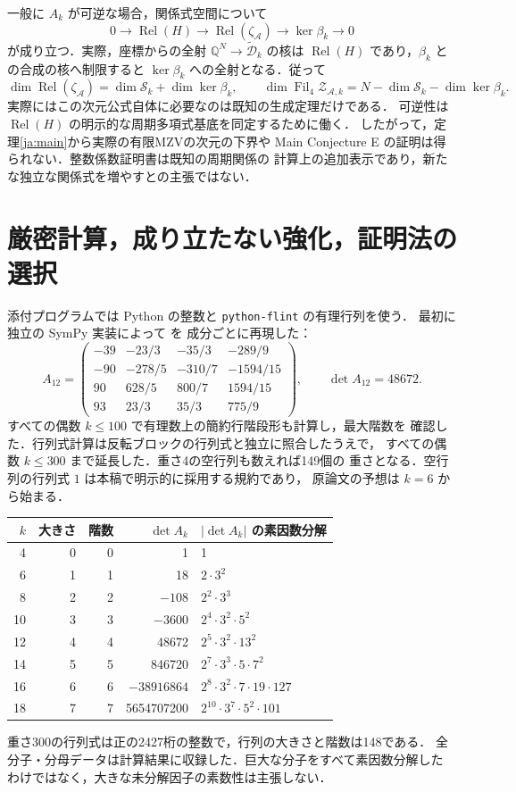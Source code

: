 \documentclass[12pt]{amsart}
\theoremstyle{definition}
\theoremstyle{remark}
\numberwithin{equation}{section}
\newcommand{\Q}{\mathbb{Q}}
\newcommand{\Fil}{\operatorname{Fil}}
\newcommand{\za}{\zeta_{\mathcal A}}
\newcommand{\Dtilde}{\widetilde{\mathcal D}_k}
\newcommand{\Relf}{\operatorname{Rel}}
\theoremstyle{definition}
\theoremstyle{remark}
\begin{document}
一般に $A_k$ が可逆な場合，関係式空間について
\begin{equation}\label{ja:exactseq}
 0\longrightarrow\Relf(H)\longrightarrow\Relf(\za)
 \longrightarrow\ker\beta_k\longrightarrow0
\end{equation}
が成り立つ．実際，座標からの全射 $\Q^N\to\Dtilde$ の核は
$\Relf(H)$ であり，$\beta_k$ との合成の核へ制限すると
$\ker\beta_k$ への全射となる．従って
\[
 \dim\Relf(\za)=\dim\mathcal S_k+\dim\ker\beta_k,
 \qquad \dim\Fil_4\mathcal Z_{\mathcal A,k}
 =N-\dim\mathcal S_k-\dim\ker\beta_k.
\]
実際にはこの次元公式自体に必要なのは既知の生成定理だけである．
可逆性は $\Relf(H)$ の明示的な周期多項式基底を同定するために働く．
したがって，定理\ref{ja:main}から実際の有限MZVの次元の下界や
Main Conjecture E の証明は得られない．整数係数証明書は既知の周期関係の
計算上の追加表示であり，新たな独立な関係式を増やすとの主張ではない．

\section{厳密計算，成り立たない強化，証明法の選択}
添付プログラムでは Python の整数と \texttt{python-flint} の有理行列を使う．
最初に独立の SymPy 実装によって \cite[Example 5.18]{jBR} を
成分ごとに再現した：
\[
 A_{12}=\begin{pmatrix}
 -39&-23/3&-35/3&-289/9\\
 -90&-278/5&-310/7&-1594/15\\
 90&628/5&800/7&1594/15\\
 93&23/3&35/3&775/9
 \end{pmatrix},\qquad\det A_{12}=48672.
\]
すべての偶数 $k\leq100$ で有理数上の簡約行階段形も計算し，最大階数を
確認した．行列式計算は反転ブロックの行列式と独立に照合したうえで，
すべての偶数 $k\leq300$ まで延長した．重さ4の空行列も数えれば149個の
重さとなる．空行列の行列式 $1$ は本稿で明示的に採用する規約であり，
原論文の予想は $k=6$ から始まる．

\begin{center}
\begin{tabular}{rrrrl}
\toprule
$k$&大きさ&階数&$\det A_k$&$|\det A_k|$ の素因数分解\\
\midrule
4&0&0&1&1\\
6&1&1&18&$2\cdot3^2$\\
8&2&2&$-108$&$2^2\cdot3^3$\\
10&3&3&$-3600$&$2^4\cdot3^2\cdot5^2$\\
12&4&4&48672&$2^5\cdot3^2\cdot13^2$\\
14&5&5&846720&$2^7\cdot3^3\cdot5\cdot7^2$\\
16&6&6&$-38916864$&$2^8\cdot3^2\cdot7\cdot19\cdot127$\\
18&7&7&5654707200&$2^{10}\cdot3^7\cdot5^2\cdot101$\\
\bottomrule
\end{tabular}
\end{center}
重さ300の行列式は正の2427桁の整数で，行列の大きさと階数は148である．
全分子・分母データは計算結果に収録した．巨大な分子をすべて素因数分解した
わけではなく，大きな未分解因子の素数性は主張しない．
\end{document}
